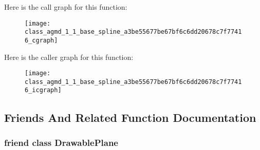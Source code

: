 Here is the call graph for this function\+:\nopagebreak
\begin{figure}[H]
\begin{center}
\leavevmode
\texttt{[image: class\_agmd\_1\_1\_base\_spline\_a3be55677be67bf6c6dd20678c7f77416\_cgraph]}
\end{center}
\end{figure}




Here is the caller graph for this function\+:\nopagebreak
\begin{figure}[H]
\begin{center}
\leavevmode
\texttt{[image: class\_agmd\_1\_1\_base\_spline\_a3be55677be67bf6c6dd20678c7f77416\_icgraph]}
\end{center}
\end{figure}




\subsection{Friends And Related Function Documentation}
\hypertarget{class_agmd_1_1_base_spline_abd140f9d7517b23f834000b9238bd85f}{
\subsubsection[{Drawable\+Plane}]{\setlength{\rightskip}{0pt plus 5cm}friend class {\bf Drawable\+Plane}\hspace{0.3cm}{\ttfamily [friend]}}}\label{class_agmd_1_1_base_spline_abd140f9d7517b23f834000b9238bd85f}


